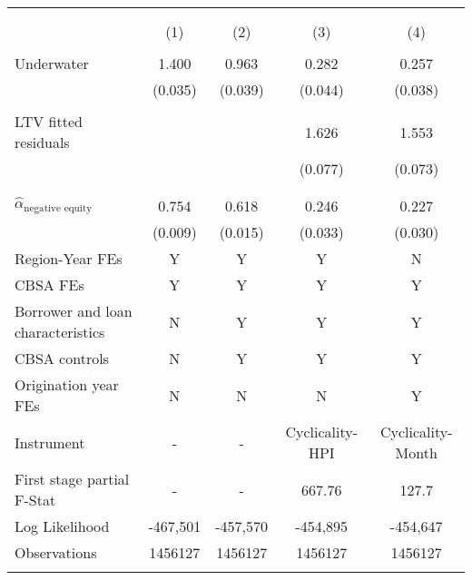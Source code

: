 
\begin{tabular}{@{\extracolsep{5pt}}lcccc} 
\\[-1.8ex]\hline 
\hline \\[-1.8ex] 
\\[-1.8ex] & (1) & (2) & (3) & (4)\\ 
\hline \\[-1.8ex] 
 Underwater & 1.400 & 0.963 & 0.282 & 0.257 \\ 
  & (0.035) & (0.039) & (0.044) & (0.038) \\ 
  & & & & \\ 
 LTV fitted residuals &  &  & 1.626 & 1.553 \\ 
  &  &  & (0.077) & (0.073) \\ 
  & & & & \\ 
\hline \\[-1.8ex] 
$\hat{\alpha}_{\text{negative equity}}$ & 0.754 & 0.618 & 0.246 & 0.227 \\ 
 & (0.009) & (0.015) & (0.033) & (0.030) \\ 
Region-Year FEs & Y & Y & Y & N \\ 
CBSA FEs & Y & Y & Y & Y \\ 
Borrower and loan characteristics & N & Y & Y & Y \\ 
CBSA controls & N & Y & Y & Y \\ 
Origination year FEs & N & N & N & Y \\ 
Instrument & - & - & Cyclicality-HPI & Cyclicality-Month \\ 
First stage partial F-Stat & - & - & 667.76 & 127.7 \\ 
Log Likelihood & -467,501 & -457,570 & -454,895 & -454,647 \\ 
Observations & 1456127 & 1456127 & 1456127 & 1456127 \\ 
\hline \\[-1.8ex] 
\end{tabular} 
